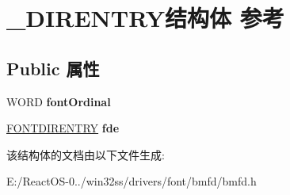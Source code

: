 \hypertarget{struct___d_i_r_e_n_t_r_y}{}\section{\+\_\+\+D\+I\+R\+E\+N\+T\+R\+Y结构体 参考}
\label{struct___d_i_r_e_n_t_r_y}
\subsection*{Public 属性}
\begin{DoxyCompactItemize}
\item 
\mbox{\label{struct___d_i_r_e_n_t_r_y_ac2e8f5547ed7b24cdf78035f4043de3e}} 
W\+O\+RD {\bfseries font\+Ordinal}
\item 
\mbox{\label{struct___d_i_r_e_n_t_r_y_aff58d281421e18addedbc205529cf852}} 
\hyperlink{struct___f_o_n_t_d_i_r_e_n_t_r_y}{F\+O\+N\+T\+D\+I\+R\+E\+N\+T\+RY} {\bfseries fde}
\end{DoxyCompactItemize}


该结构体的文档由以下文件生成\+:\begin{DoxyCompactItemize}
\item 
E\+:/\+React\+O\+S-\/0../win32ss/drivers/font/bmfd/bmfd.\+h\end{DoxyCompactItemize}
